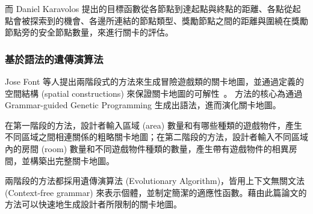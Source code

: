 而 Daniel Karavolos 提出的目標函數從各節點到達起點與終點的距離、各點從起點會被探索到的機會、各邊所連結的節點類型、獎勵節點之間的距離與圍繞在獎勵節點旁的安全節點數量，來進行關卡的評估。

\subsubsection{基於語法的遺傳演算法}
\label{sssec:relatedworks-ga-forpcg-grammarbased}

Jose Font 等人提出兩階段式的方法來生成冒險遊戲類的關卡地圖，並通過定義的空間結構 (spatial constructions) 來保證關卡地圖的可解性~\cite{font2016constrained}。 方法的核心為通過 Grammar-guided Genetic Programming 生成出語法，進而演化關卡地圖。

在第一階段的方法，設計者輸入區域 (area) 數量和有哪些種類的遊戲物件，產生不同區域之間相連關係的粗略關卡地圖；在第二階段的方法，設計者輸入不同區域內的房間 (room) 數量和不同遊戲物件種類的數量，產生帶有遊戲物件的相異房間，並構築出完整關卡地圖。

兩階段的方法都採用遺傳演算法 (Evolutionary Algorithm)，皆用上下文無關文法 (Context-free grammar) 來表示個體，並制定簡潔的適應性函數。藉由此篇論文的方法可以快速地生成設計者所限制的關卡地圖。
